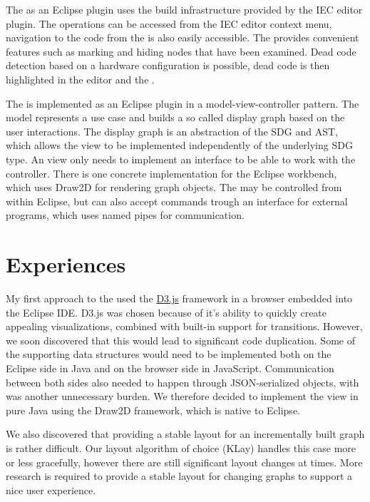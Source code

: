The \SB as an Eclipse plugin uses the build infrastructure provided by the IEC editor plugin. The \SB operations can be 
accessed from the IEC editor context menu, navigation to the code from the \SB is also easily accessible. The \SB 
provides convenient features such as marking and hiding nodes that have been examined. Dead code detection based on a 
hardware configuration is possible, dead code is then highlighted in the editor and the \SB.

The \SB is implemented as an Eclipse plugin in a model-view-controller pattern. The model represents a use case and 
builds a so called display graph based on the user interactions. The display graph is an abstraction of the SDG and 
AST, which allows the view to be implemented independently of the underlying SDG type. An \SB view only needs to 
implement an interface to be able to work with the controller. There is one concrete implementation for the Eclipse 
workbench, which uses Draw2D for rendering graph objects. The \SB may be controlled from within Eclipse, but can also 
accept commands trough an interface for external programs, which uses named pipes for communication.

\section{Experiences}

My first approach to the \SB used the \href{https://d3js.org/}{D3.js} framework in a browser embedded into the Eclipse 
IDE\footnotemark. D3.js was chosen because of it's ability to quickly create appealing visualizations, combined with 
built-in support for transitions. However, we soon discovered that this would lead to significant code duplication. 
Some of the supporting data structures would need to be implemented both on the Eclipse side in Java and on the 
browser side in JavaScript. Communication between both sides also needed to happen through JSON-serialized objects, 
with was another unnecessary burden. We therefore decided to implement the view in pure Java using the Draw2D 
framework, which is native to Eclipse.


We also discovered that providing a stable layout for an incrementally built graph is rather difficult. Our layout 
algorithm of choice (KLay) handles this case more or less gracefully, however there are still significant layout 
changes at times. More research is required to provide a stable layout for  changing graphs to support a nice user 
experience.
